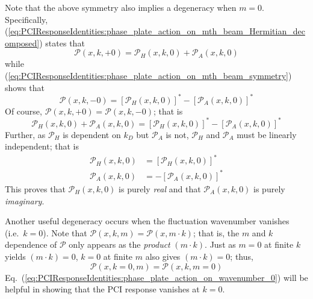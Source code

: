 Note that the above symmetry also implies a degeneracy when $m = 0$.
Specifically,
(\ref{eq:PCIResponseIdentities:phase_plate_action_on_mth_beam_Hermitian_decomposed})
states that
\begin{equation}
  \mathcal{P}(x, k, +0)
  =
  \mathcal{P}_H(x, k, 0)
  +
  \mathcal{P}_A(x, k, 0)
  \label{eq:PCIResponseIdentities:phase_plate_action_on_plus0_beam}
\end{equation}
while (\ref{eq:PCIResponseIdentities:phase_plate_action_on_mth_beam_symmetry})
shows that
\begin{equation}
  \mathcal{P}(x, k, -0)
  =
  [\mathcal{P}_H(x, k, 0)]^*
  -
  [\mathcal{P}_A(x, k, 0)]^*
  \label{eq:PCIResponseIdentities:phase_plate_action_on_minus0_beam}
\end{equation}
Of course, $\mathcal{P}(x, k, +0) = \mathcal{P}(x, k, -0)$; that is
\begin{equation}
  \mathcal{P}_H(x, k, 0)
  +
  \mathcal{P}_A(x, k, 0)
  =
  [\mathcal{P}_H(x, k, 0)]^*
  -
  [\mathcal{P}_A(x, k, 0)]^*
\end{equation}
Further, as $\mathcal{P}_H$ is dependent on $k_D$ but $\mathcal{P}_A$ is not,
$\mathcal{P}_H$ and $\mathcal{P}_A$ must be linearly independent;
that is
\begin{align}
  \mathcal{P}_H(x, k, 0) &= [\mathcal{P}_H(x, k, 0)]^*
  \\
  \mathcal{P}_A(x, k, 0) &= -[\mathcal{P}_A(x, k, 0)]^*
\end{align}
This proves that $\mathcal{P}_H(x, k, 0)$ is purely \emph{real} and
that $\mathcal{P}_A(x, k, 0)$ is purely \emph{imaginary}.

Another useful degeneracy occurs
when the fluctuation wavenumber vanishes (i.e.\ $k = 0$).
Note that $\mathcal{P}(x, k, m) = \mathcal{P}(x, m \cdot k)$;
that is, the $m$ and $k$ dependence of $\mathcal{P}$
only appears as the \emph{product} $(m \cdot k)$.
Just as $m = 0$ at finite $k$ yields $(m \cdot k) = 0$,
$k = 0$ at finite $m$ also gives $(m \cdot k) = 0$;
thus,
\begin{equation}
  \mathcal{P}(x, k=0, m) = \mathcal{P}(x, k, m=0)
  \label{eq:PCIResponseIdentities:phase_plate_action_on_wavenumber_0}
\end{equation}
Eq.~(\ref{eq:PCIResponseIdentities:phase_plate_action_on_wavenumber_0})
will be helpful in showing that the PCI response vanishes at $k = 0$.
